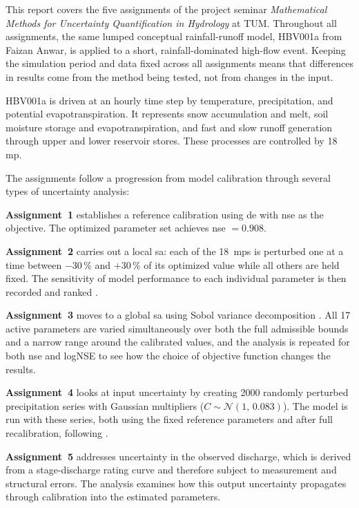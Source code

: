 This report covers the five assignments of the project seminar \textit{Mathematical Methods for Uncertainty Quantification in Hydrology} at TUM. Throughout all assignments, the same lumped conceptual rainfall-runoff model, HBV001a from Faizan Anwar, is applied to a short, rainfall-dominated high-flow event. Keeping the simulation period and data fixed across all assignments means that differences in results come from the method being tested, not from changes in the input.

HBV001a is driven at an hourly time step by temperature, precipitation, and potential evapotranspiration. It represents snow accumulation and melt, soil moisture storage and evapotranspiration, and fast and slow runoff generation through upper and lower reservoir stores. These processes are controlled by 18 \ac{mp}.

The assignments follow a progression from model calibration through several types of uncertainty analysis:

\textbf{Assignment~1} establishes a reference calibration using \ac{de} with \ac{nse} as the objective. The optimized parameter set achieves \ac{nse} $= 0.908$.

\textbf{Assignment~2} carries out a local \ac{sa}: each of the 18~\acp{mp} is perturbed one at a time between $-30\,\%$ and $+30\,\%$ of its optimized value while all others are held fixed. The sensitivity of model performance to each individual parameter is then recorded and ranked \autocite{Smith.2014}.

\textbf{Assignment~3} moves to a global \ac{sa} using Sobol variance decomposition \autocite{Saltelli.2002}. All 17 active parameters are varied simultaneously over both the full admissible bounds and a narrow range around the calibrated values, and the analysis is repeated for both \ac{nse} and logNSE to see how the choice of objective function changes the results.

\textbf{Assignment~4} looks at input uncertainty by creating 2000 randomly perturbed precipitation series with Gaussian multipliers ($C \sim \mathcal{N}(1,\,0.083)$). The model is run with these series, both using the fixed reference parameters and after full recalibration, following \textcite{Oudin.2006}.

\textbf{Assignment~5} addresses uncertainty in the observed discharge, which is derived from a stage-discharge rating curve and therefore subject to measurement and structural errors. The analysis examines how this output uncertainty propagates through calibration into the estimated parameters.
